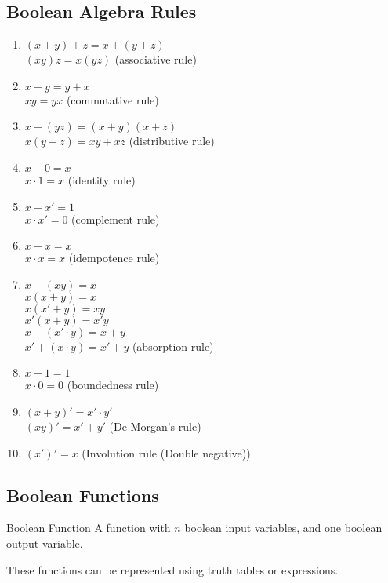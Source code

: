 \documentclass[\main/notes.tex]{subfiles}
\begin{document}
			\subsection{Boolean Algebra Rules}
				\begin{enumerate}[label=(\alph*), labelsep=2.5em, leftmargin=*]
					\item $(x + y) + z = x + (y + z)$\\
						$(xy)z = x(yz)$ \hfill (associative rule)
					\item $x + y = y + x$\\
						$xy = yx$ \hfill (commutative rule)
					\item $x + (yz) = (x + y)(x + z)$\\
						$x(y + z) = xy + xz$ \hfill (distributive rule)
					\item $x + 0 = x$\\
						$x \cdot 1 = x$ \hfill (identity rule)
					\item $x + x' = 1$\\
						$x \cdot x' = 0$ \hfill (complement rule)
					\item $x + x = x$\\
						$x \cdot x = x$ \hfill (idempotence rule)
					\item $x + (xy) = x$\\
						$x (x + y) = x$\\
						$x (x' + y) = xy$\\
						$x'(x + y) = x'y$\\
						$x + (x' \cdot y) = x + y$\\
						$x' + (x \cdot y) = x' + y$ \hfill (absorption rule)
					\item $x + 1 = 1$\\
						$x \cdot 0 = 0$ \hfill (boundedness rule)
					\item $(x + y)' = x' \cdot y'$\\
						$(xy)' = x' + y'$ \hfill (De Morgan's rule)
					\item $\left(x'\right)' = x$ \hfill (Involution rule (Double negative))
				\end{enumerate}
			\subsection{Boolean Functions}
				\begin{definition}{Boolean Function}
					A function with $n$ boolean input variables, and one boolean output variable.
					\begin{indentparagraph}
						These functions can be represented using truth tables or expressions.
					\end{indentparagraph}
				\end{definition}
\end{document}
